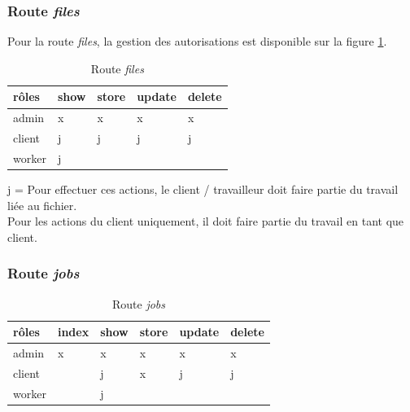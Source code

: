 \documentclass[
    iai, %
    il, %
]{heig-tb}
\begin{document}
\subsubsection{Route \emph{files}}
Pour la route \emph{files}, la gestion des autorisations est disponible sur la figure \ref{autorisations-route-files}.

\begin{table}[h]
    \begin{center}
        \caption{Route \emph{files} \label{autorisations-route-files}}
        \begin{tabularx}{1.0\textwidth} {X|X|X|X|X}
            rôles  & show & store & update & delete \\ \hline
            admin  & x    & x     & x      & x      \\
            client & j    & j     & j      & j      \\
            worker & j    &       &        &        \\
        \end{tabularx}
    \end{center}
\end{table}

j = Pour effectuer ces actions, le client / travailleur doit faire partie du travail liée au fichier. \\
Pour les actions du client uniquement, il doit faire partie du travail en tant que client.

\subsubsection{Route \emph{jobs}}


\begin{table}[h]
    \begin{center}
        \caption{Route \emph{jobs} \label{autorisations-route-jobs}}
        \begin{tabularx}{1.0\textwidth} {X|X|X|X|X|X}
            rôles  & index & show & store & update & delete \\ \hline
            admin  & x     & x    & x     & x      & x      \\
            client &       & j    & x     & j      & j      \\
            worker &       & j    &       &        &        \\
        \end{tabularx}
    \end{center}
\end{table}
\end{document}

